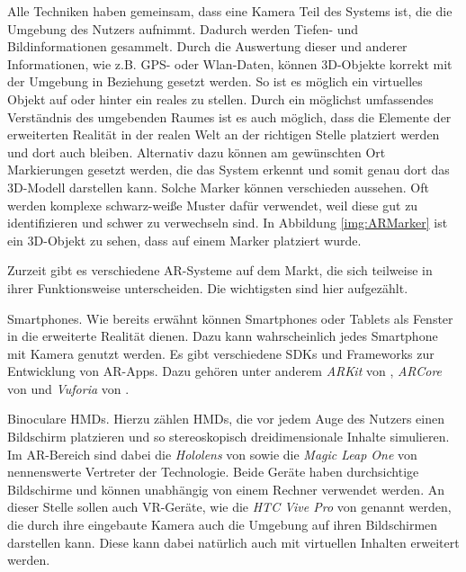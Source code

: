 Alle Techniken haben gemeinsam, dass eine Kamera Teil des Systems ist, die die Umgebung des Nutzers aufnimmt. Dadurch werden Tiefen- und Bildinformationen gesammelt. Durch die Auswertung dieser und anderer Informationen, wie z.B. GPS- oder Wlan-Daten, können 3D-Objekte korrekt mit der Umgebung in Beziehung gesetzt werden. So ist es möglich ein virtuelles Objekt auf oder hinter ein reales zu stellen. Durch ein möglichst umfassendes Verständnis des umgebenden Raumes ist es auch möglich, dass die Elemente der erweiterten Realität in der realen Welt an der richtigen Stelle platziert werden und dort auch bleiben.
Alternativ dazu können am gewünschten Ort Markierungen gesetzt werden, die das System erkennt und somit genau dort das 3D-Modell darstellen kann. Solche Marker können verschieden aussehen. Oft werden komplexe schwarz-weiße Muster dafür verwendet, weil diese gut zu identifizieren und schwer zu verwechseln sind. In Abbildung \ref{img:ARMarker} ist ein 3D-Objekt zu sehen, dass auf einem Marker platziert wurde. 

Zurzeit gibt es verschiedene AR-Systeme auf dem Markt, die sich teilweise in ihrer Funktionsweise unterscheiden. Die wichtigsten sind hier aufgezählt.

Smartphones. Wie bereits erwähnt können Smartphones oder Tablets als Fenster in die erweiterte Realität dienen. Dazu kann wahrscheinlich jedes Smartphone mit Kamera genutzt werden. Es gibt verschiedene SDKs und Frameworks zur Entwicklung von AR-Apps. Dazu gehören unter anderem \textit{ARKit} von \citet{ARKit}, \textit{ARCore} von \citet{ARCore} und \textit{Vuforia} von \citet{vuforia}.

Binoculare HMDs. Hierzu zählen HMDs, die vor jedem Auge des Nutzers einen Bildschirm platzieren und so stereoskopisch dreidimensionale Inhalte simulieren. Im AR-Bereich sind dabei die \textit{Hololens} von \citet{hololens} sowie die \textit{Magic Leap One} von \citet{magicLeap} nennenswerte Vertreter der Technologie. Beide Geräte haben durchsichtige Bildschirme und können unabhängig von einem Rechner verwendet werden. 
An dieser Stelle sollen auch VR-Geräte, wie die \textit{HTC Vive Pro} von \citet{vivePro} genannt werden, die durch ihre eingebaute Kamera auch die Umgebung auf ihren Bildschirmen darstellen kann. Diese kann dabei natürlich auch mit virtuellen Inhalten erweitert werden. 


